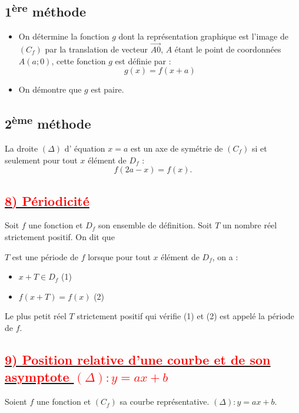\documentclass[12pt]{article}
\begin{document}
\subsection*{1\textsuperscript{ère} méthode}

\begin{itemize}
    \item On détermine la fonction $g$ dont la représentation graphique est l’image de $(C_f)$ par la translation de vecteur $\overrightarrow{A0}$, $A$ étant le point de coordonnées $A(a; 0)$, cette fonction $g$ est définie par :
    \[
    g(x) = f(x + a)
    \]
    \item On démontre que $g$ est paire.
\end{itemize}

\subsection*{2\textsuperscript{ème} méthode}

La droite $(\Delta)$ d' équation $x = a$ est un axe de symétrie de $(C_f)$ si et seulement pour tout $x$ élément de $D_f$ :
\[
f(2a - x) = f(x).
\]


\subsection*{\underline{\textbf{\textcolor{red}{8) Périodicité}}}}

Soit $f$ une fonction et $D_f$ son ensemble de définition. Soit $T$ un nombre réel strictement positif. On dit que 

$T$ est une période de $f$ lorsque pour tout $x$ élément de $D_f$, on a :

\begin{itemize}
    \item $x + T \in D_f$ \hfill (1)
    \item $f(x + T) = f(x)$ \hfill (2)
\end{itemize}

Le plus petit réel $T$ strictement positif qui vérifie (1) et (2) est appelé la période de $f$.
\subsection*{\underline{\textbf{\textcolor{red}{9) Position relative d’une courbe et de son asymptote \( (\Delta): y = ax + b \)}}}}

Soient $f$ une fonction et $(C_f)$ sa courbe représentative. $(\Delta) : y = ax + b$.
\end{document}
